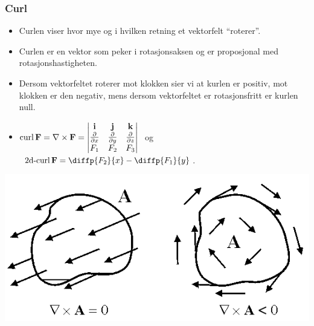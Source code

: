 \begin{frame}
  \frametitle{Curl}
  \begin{itemize}
  \item Curlen viser hvor mye og i hvilken retning et
      vektorfelt “roterer”.
      \item Curlen er en vektor som peker i rotasjonsaksen og er proposjonal med rotasjonshastigheten.
    \item Dersom vektorfeltet roterer mot klokken sier vi at kurlen er positiv,
mot klokken er den negativ, mens dersom vektorfeltet er rotasjonsfritt er kurlen
      null.
    \item $\operatorname{curl} \mathbf{F} = \nabla \times \mathbf{F} =
      \begin{vmatrix} \mathbf{i} & \mathbf{j} & \mathbf{k} \\ \frac{\partial}{\partial x} &
        \frac{\partial}{\partial y} & \frac{\partial}{\partial z}\\ F_1 & F_2  & F_3
      \end{vmatrix} \ $ og $ \ \2d-curl \F = \diffp{{F_2}}{x} - \diffp{{F_1}}{y} $.
  \end{itemize}
  \begin{center}
      \includegraphics[scale=0.5]{../img/curl-negative.png}
\end{center}
\end{frame}

